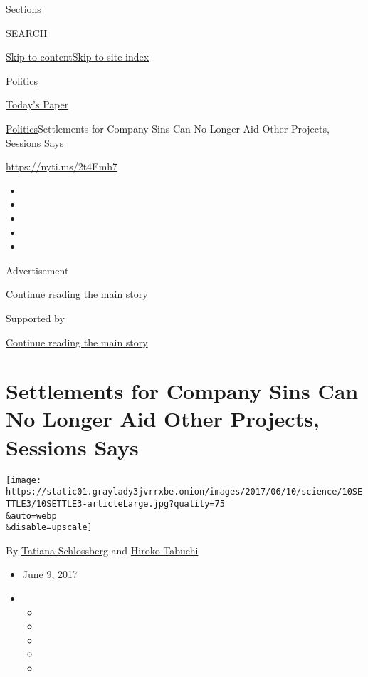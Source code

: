 Sections

SEARCH

\protect\hyperlink{site-content}{Skip to
content}\protect\hyperlink{site-index}{Skip to site index}

\href{https://www.nytimes3xbfgragh.onion/section/politics}{Politics}

\href{https://myaccount.nytimes3xbfgragh.onion/auth/login?response_type=cookie\&client_id=vi}{}

\href{https://www.nytimes3xbfgragh.onion/section/todayspaper}{Today's
Paper}

\href{/section/politics}{Politics}\textbar{}Settlements for Company Sins
Can No Longer Aid Other Projects, Sessions Says

\url{https://nyti.ms/2t4Emh7}

\begin{itemize}
\item
\item
\item
\item
\item
\end{itemize}

Advertisement

\protect\hyperlink{after-top}{Continue reading the main story}

Supported by

\protect\hyperlink{after-sponsor}{Continue reading the main story}

\hypertarget{settlements-for-company-sins-can-no-longer-aid-other-projects-sessions-says}{%
\section{Settlements for Company Sins Can No Longer Aid Other Projects,
Sessions
Says}\label{settlements-for-company-sins-can-no-longer-aid-other-projects-sessions-says}}

\texttt{[image: https://static01.graylady3jvrrxbe.onion/images/2017/06/10/science/10SETTLE3/10SETTLE3-articleLarge.jpg?quality=75\\\&auto=webp\\\&disable=upscale]}

By
\href{https://www.nytimes3xbfgragh.onion/by/tatiana-schlossberg}{Tatiana
Schlossberg} and
\href{http://www.nytimes3xbfgragh.onion/by/hiroko-tabuchi}{Hiroko
Tabuchi}

\begin{itemize}
\item
  June 9, 2017
\item
  \begin{itemize}
  \item
  \item
  \item
  \item
  \item
  \end{itemize}
\end{itemize}

